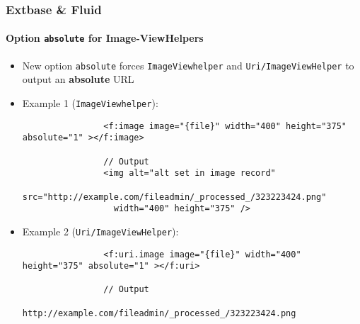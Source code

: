 \begin{frame}[fragile]
	\frametitle{Extbase \& Fluid}
	\framesubtitle{Option \texttt{absolute} for Image-ViewHelpers}

	\lstset{basicstyle=\tiny\ttfamily}

	\begin{itemize}

		\item New option \texttt{absolute} forces \texttt{ImageViewhelper} and
			\texttt{Uri/ImageViewHelper} to output an \textbf{absolute} URL

		\item Example 1 (\texttt{ImageViewhelper}):

			\begin{lstlisting}
				<f:image image="{file}" width="400" height="375" absolute="1" ></f:image>

				// Output
				<img alt="alt set in image record"
				  src="http://example.com/fileadmin/_processed_/323223424.png"
				  width="400" height="375" />
			\end{lstlisting}

		\item Example 2 (\texttt{Uri/ImageViewHelper}):

			\begin{lstlisting}
				<f:uri.image image="{file}" width="400" height="375" absolute="1" ></f:uri>

				// Output
				http://example.com/fileadmin/_processed_/323223424.png
			\end{lstlisting}

	\end{itemize}

\end{frame}


